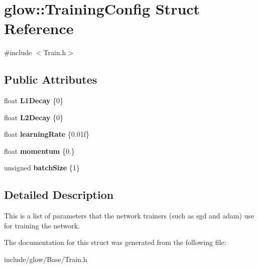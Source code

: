 \hypertarget{structglow_1_1_training_config}{}\section{glow\+:\+:Training\+Config Struct Reference}
\label{structglow_1_1_training_config}


{\ttfamily \#include $<$Train.\+h$>$}

\subsection*{Public Attributes}
\begin{DoxyCompactItemize}
\item 
\mbox{\label{structglow_1_1_training_config_a9839f42c9024d9e9aefec62fe8ab65c7}} 
float {\bfseries L1\+Decay} \{0\}
\item 
\mbox{\label{structglow_1_1_training_config_a4860869d5cca2d860d082b24b028f54e}} 
float {\bfseries L2\+Decay} \{0\}
\item 
\mbox{\label{structglow_1_1_training_config_adbaa08bf5968243aeecaa7e63938c4b5}} 
float {\bfseries learning\+Rate} \{0.\+01f\}
\item 
\mbox{\label{structglow_1_1_training_config_a0152292be9416a79cee878276ee2eb6f}} 
float {\bfseries momentum} \{0.\}
\item 
\mbox{\label{structglow_1_1_training_config_acc08b52970e43efe2f4427430bc1fbef}} 
unsigned {\bfseries batch\+Size} \{1\}
\end{DoxyCompactItemize}


\subsection{Detailed Description}
This is a list of parameters that the network trainers (such as sgd and adam) use for training the network. 

The documentation for this struct was generated from the following file\+:\begin{DoxyCompactItemize}
\item 
include/glow/\+Base/Train.\+h\end{DoxyCompactItemize}

